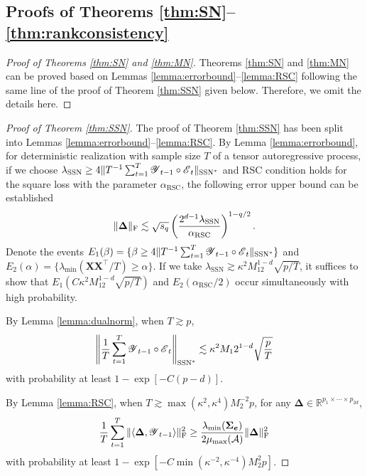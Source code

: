 \documentclass[12pt]{article}
\newcommand{\bm}{\boldsymbol}
\newcommand{\cm}[1]{\mbox{\boldmath$\mathscr{#1}$}}
\begin{document}
\subsection{Proofs of Theorems \ref{thm:SN}--\ref{thm:rankconsistency} \label{subsec:proof_theorem}}


\begin{proof}[Proof of Theorems \ref{thm:SN} and \ref{thm:MN}]	
	Theorems \ref{thm:SN} and \ref{thm:MN} can be proved based on Lemmas \ref{lemma:errorbound}--\ref{lemma:RSC} following the same line of the proof of Theorem \ref{thm:SSN} given below. Therefore, we omit the details here.	
\end{proof}

\begin{proof}[Proof of Theorem \ref{thm:SSN}]
	
	The proof of Theorem \ref{thm:SSN} has been split into Lemmas \ref{lemma:errorbound}--\ref{lemma:RSC}.	
	By Lemma \ref{lemma:errorbound}, for deterministic realization with sample size $T$ of a tensor autoregressive process, if we choose $\lambda_{\text{SSN}}\geq4\|T^{-1}\sum_{t=1}^T\cm{Y}_{t-1}\circ\cm{E}_t\|_{\text{SSN}^*}$ and RSC condition holds for the square loss with the parameter $\alpha_{\text{RSC}}$, the following error upper bound can be established
	\begin{equation}
	\|\bm{\Delta}\|_\textup{F}\lesssim\sqrt{s_q}\left(\frac{2^{d-1}\lambda_{\textup{SSN}}}{\alpha_{\textup{RSC}}}\right)^{1-q/2}.
	\end{equation}
	Denote the events $E_1(\beta)=\{\beta\geq4\|T^{-1}\sum_{t=1}^T\cm{Y}_{t-1}\circ\cm{E}_t\|_{\text{SSN}^*}\}$ and $E_2(\alpha)=\{\lambda_{\min}(\bm{X}\bm{X}^\top/T)\geq\alpha\}$.
	If we take $\lambda_{\text{SSN}}\gtrsim \kappa^2M_12^{1-d}\sqrt{p/T}$, it suffices to show that $E_1(C\kappa^2M_12^{1-d}\sqrt{p/T})$ and $E_2(\alpha_{\text{RSC}}/2)$ occur simultaneously with high probability.
	
	By Lemma \ref{lemma:dualnorm}, when $T\gtrsim p$,
	\begin{equation}
	\left\|\frac{1}{T}\sum_{t=1}^T\cm{Y}_{t-1}\circ\cm{E}_t\right\|_{\text{SSN}^*}\lesssim\kappa^2M_1  2^{1-d} \sqrt{\frac{p}{T}}
	\end{equation}
	with probability at least $1-\exp[-C(p-d)]$. 
	
	By Lemma \ref{lemma:RSC}, when $T\gtrsim\max(\kappa^2,\kappa^4)M_2^{-2}p$, for any $\bm{\Delta}\in\mathbb{R}^{p_1\times\cdots\times p_{2d}}$,
	\begin{equation}
	\frac{1}{T}\sum_{t=1}^T	\|\langle\bm{\Delta},\cm{Y}_{t-1}\rangle\|_\text{F}^2\geq\frac{\lambda_{\min}(\bm{\Sigma_e})}{2\mu_{\max}(\mathcal{A})}\|\bm{\Delta}\|_{\text{F}}^2
	\end{equation}
	with probability at least $1-\exp[-C\min(\kappa^{-2},\kappa^{-4})M_2^2p]$.
	

\end{proof}
\end{document}
